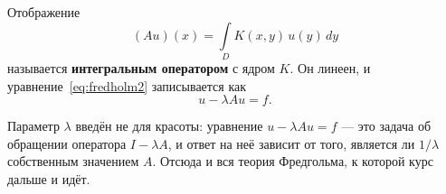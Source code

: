 \begin{definition}
Отображение
\[
  (Au)(x) = \int\limits_{D} K(x,y)\, u(y)\, dy
\]
называется \textbf{интегральным оператором} с ядром $K$. Он линеен, и
уравнение~\eqref{eq:fredholm2} записывается как
\[
  u - \lambda A u = f .
\]
\end{definition}

\begin{idea}
Параметр $\lambda$ введён не для красоты: уравнение $u - \lambda Au = f$ —
это задача об обращении оператора $I - \lambda A$, и ответ на неё зависит от
того, является ли $1/\lambda$ собственным значением $A$. Отсюда и вся теория
Фредгольма, к которой курс дальше и идёт.
\end{idea}
